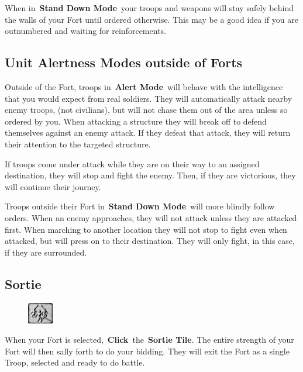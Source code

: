 When in \textbf{Stand Down Mode} your troops and weapons will stay safely behind the walls of your Fort until ordered otherwise. This may be a good idea if you are outnumbered and waiting for reinforcements.

\subsection{Unit Alertness Modes outside of Forts}

 Outside of the Fort, troops in \textbf{Alert Mode} will behave with the intelligence that you would expect from real soldiers. They will automatically attack nearby enemy troops, (not civilians), but will not chase them out of the area unless so ordered by you. When attacking a structure they will break off to defend themselves against an enemy attack. If they defeat that attack, they will return their attention to the targeted structure.

If troops come under attack while they are on their way to an assigned destination, they will stop and fight the enemy. Then, if they are victorious, they will continue their journey.

Troops outside their Fort in \textbf{Stand Down Mode} will more blindly follow orders. When an enemy approaches, they will not attack unless they are attacked first. When marching to another location they will not stop to fight even when attacked, but will press on to their destination. They will only fight, in this case, if they are surrounded.

\clearpage

\subsection{Sortie}

\begin{figure}
	\vspace{-20pt}
	\begin{center}
		\includegraphics[width=0.1\textwidth]{Tsortie}
	\end{center}
	\vspace{-20pt}
\end{figure}

When your Fort is selected, \textbf{Click} the \textbf{Sortie Tile}. The entire strength of your Fort will then sally forth to do your bidding. They will exit the Fort as a single Troop, selected and ready to do battle.

